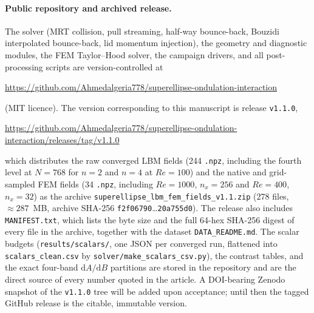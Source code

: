 \paragraph{Public repository and archived release.}
The solver (MRT collision, pull streaming, half-way bounce-back, Bouzidi interpolated bounce-back, lid momentum injection), the geometry and diagnostic modules, the FEM Taylor--Hood solver, the campaign drivers, and all post-processing scripts are version-controlled at
\begin{center}
\url{https://github.com/Ahmedalgeria778/superellipse-ondulation-interaction}
\end{center}
(MIT licence). The version corresponding to this manuscript is release \texttt{v1.1.0},
\begin{center}
\url{https://github.com/Ahmedalgeria778/superellipse-ondulation-interaction/releases/tag/v1.1.0}
\end{center}
which distributes the raw converged LBM fields (244 \texttt{.npz}, including the fourth level at $N=768$ for $n=2$ and $n=4$ at $Re=100$) and the native and grid-sampled FEM fields (34 \texttt{.npz}, including $Re=1000$, $n_x=256$ and $Re=400$, $n_x=32$) as the archive \texttt{superellipse\_lbm\_fem\_fields\_v1.1.zip} (278 files, $\approx287$~MB, archive SHA-256 \texttt{f2f06790}\ldots\texttt{20a755d0}). The release also includes \texttt{MANIFEST.txt}, which lists the byte size and the full 64-hex SHA-256 digest of every file in the archive, together with the dataset \texttt{DATA\_README.md}. The scalar budgets (\texttt{results/scalars/}, one JSON per converged run, flattened into \texttt{scalars\_clean.csv} by \texttt{solver/make\_scalars\_csv.py}), the contrast tables, and the exact four-band $\mathrm{d}A/\mathrm{d}B$ partitions are stored in the repository and are the direct source of every number quoted in the article. A DOI-bearing Zenodo snapshot of the \texttt{v1.1.0} tree will be added upon acceptance; until then the tagged GitHub release is the citable, immutable version.
